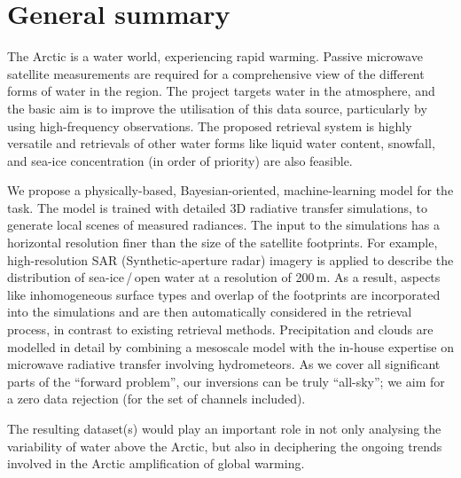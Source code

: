 \documentclass[12pt,oneside,a4paper]{article}
\begin{document}
	
	
	\thispagestyle{empty}
	\vspace*{-10mm}
	\noindent
	\textbf{\Large \LongTitle}




\section{General summary}
%
The Arctic is a water world, experiencing rapid warming. Passive microwave
satellite measurements are required for a comprehensive view of the different forms of water in the region. The project targets water in the atmosphere, and the basic aim is to improve the utilisation of this data source, particularly by using high-frequency observations. The proposed retrieval system is highly versatile and retrievals of other water forms like liquid water content, snowfall, and sea-ice concentration (in order of priority) are also feasible.

We propose a physically-based, Bayesian-oriented, machine-learning model for
the task. The model is trained with detailed 3D radiative transfer simulations,
to generate local scenes of measured radiances. The input to the simulations
has a horizontal resolution finer than the size of the satellite footprints.
For example, high-resolution SAR (Synthetic-aperture radar) imagery is applied to describe the distribution of sea-ice\,/\,open water at a resolution of 200\,m. As a result, aspects like inhomogeneous surface types and overlap of the footprints are
incorporated into the simulations and are then automatically considered in the
retrieval process, in contrast to existing retrieval methods. Precipitation and
clouds are modelled in detail by combining a mesoscale model with the in-house
expertise on microwave radiative transfer involving hydrometeors. As we cover
all significant parts of the ``forward problem'', our inversions can be truly
``all-sky''; we aim for a zero data rejection (for the set of channels
included).

The resulting dataset(s) would play an important role in not only analysing the
variability of water above the Arctic, but also in deciphering the
ongoing trends involved in the Arctic amplification of global warming.
\end{document}
